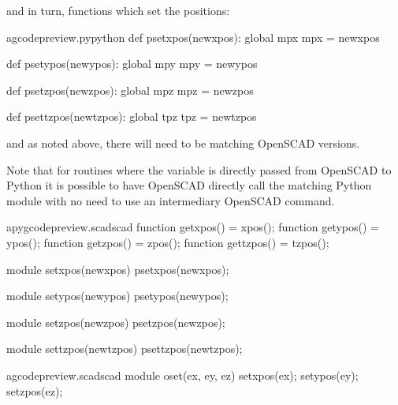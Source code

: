 \documentclass{ltxdoc}
\begin{document}
\noindent and in turn, functions which set the positions: 

\lstset{firstnumber=\thegcpy}
\begin{writecode}{a}{gcodepreview.py}{python}
def psetxpos(newxpos):
    global mpx
    mpx = newxpos

def psetypos(newypos):
    global mpy
    mpy = newypos

def psetzpos(newzpos):
    global mpz
    mpz = newzpos
 
def psettzpos(newtzpos):
    global tpz
    tpz = newtzpos

\end{writecode}
\addtocounter{gcpy}{16}
 
\noindent and as noted above, there will need to be matching OpenSCAD versions. 

\noindent{}%
%
%
%
%
%
%
%
Note that for routines where the variable is directly passed from OpenSCAD to Python
it is possible to have OpenSCAD directly call the matching Python module with no need
to use an intermediary OpenSCAD command.
 
\lstset{firstnumber=\thepyscad}
\begin{writecode}{a}{pygcodepreview.scad}{scad}
function getxpos() = xpos();
function getypos() = ypos();
function getzpos() = zpos();
function gettzpos() = tzpos();

module setxpos(newxpos) {
    psetxpos(newxpos);
}

module setypos(newypos) {
    psetypos(newypos);
}

module setzpos(newzpos) {
    psetzpos(newzpos);
}

module settzpos(newtzpos) {
    psettzpos(newtzpos);
}

\end{writecode}
\addtocounter{pyscad}{21}
 
\lstset{firstnumber=\thegcpscad}
\begin{writecode}{a}{gcodepreview.scad}{scad}
module oset(ex, ey, ez) {
    setxpos(ex);
    setypos(ey);
    setzpos(ez);
}

\end{writecode}
\addtocounter{gcpscad}{6}
 
\end{document}
